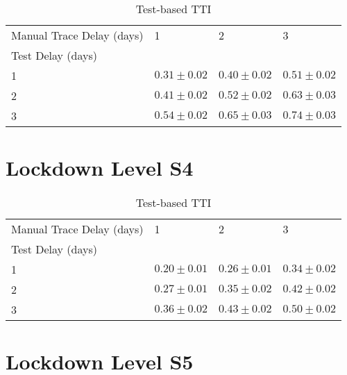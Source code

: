 \documentclass{article}
\begin{document}
    \begin{table}[H]
         \begin{tabular}{llll}
\toprule
Manual Trace Delay (days) &                1 &                2 &                3 \\
Test Delay (days) &                  &                  &                  \\
\midrule
1                 &  $0.31 \pm 0.02$ &  $0.40 \pm 0.02$ &  $0.51 \pm 0.02$ \\
2                 &  $0.41 \pm 0.02$ &  $0.52 \pm 0.02$ &  $0.63 \pm 0.03$ \\
3                 &  $0.54 \pm 0.02$ &  $0.65 \pm 0.03$ &  $0.74 \pm 0.03$ \\
\bottomrule
\end{tabular}

        \caption{Test-based TTI}
    \end{table}
    

\clearpage

\section{Lockdown Level S4}


    \begin{table}[H]
         \begin{tabular}{llll}
\toprule
Manual Trace Delay (days) &                1 &                2 &                3 \\
Test Delay (days) &                  &                  &                  \\
\midrule
1                 &  $0.20 \pm 0.01$ &  $0.26 \pm 0.01$ &  $0.34 \pm 0.02$ \\
2                 &  $0.27 \pm 0.01$ &  $0.35 \pm 0.02$ &  $0.42 \pm 0.02$ \\
3                 &  $0.36 \pm 0.02$ &  $0.43 \pm 0.02$ &  $0.50 \pm 0.02$ \\
\bottomrule
\end{tabular}

        \caption{Test-based TTI}
    \end{table}
    

\clearpage

\section{Lockdown Level S5}
\end{document}
